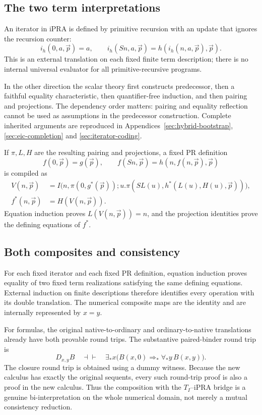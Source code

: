 \documentclass[11pt]{article}
\theoremstyle{definition}
\theoremstyle{remark}
\begin{document}
\subsection{The two term interpretations}

An iterator in iPRA is defined by primitive recursion with an update that
ignores the recursion counter:
\[
 i_h(0,a,\vec p)=a,\qquad
 i_h(Sn,a,\vec p)=h(i_h(n,a,\vec p),\vec p).
\]
This is an external translation on each fixed finite term description;
there is no internal universal evaluator for all primitive-recursive
programs.

In the other direction the scalar theory first constructs predecessor,
then a faithful equality characteristic, then quantifier-free induction,
and then pairing and projections. The dependency order matters: pairing
and equality reflection cannot be used as assumptions in the predecessor
construction. Complete inherited arguments are reproduced in
Appendices~\ref{sec:hybrid-bootstrap}, \ref{sec:eic-completion} and
\ref{sec:iterator-coding}.

If \(\pi,L,H\) are the resulting pairing and projections, a fixed PR
definition
\[
 f(0,\vec p)=g(\vec p),\qquad
 f(Sn,\vec p)=h(n,f(n,\vec p),\vec p)
\]
is compiled as
\begin{align*}
 V(n,\vec p)&=I\bigl(n,\pi(0,g^*(\vec p));
 u.\pi(SL(u),h^*(L(u),H(u),\vec p))\bigr),\\
 f^*(n,\vec p)&=H(V(n,\vec p)).
\end{align*}
Equation induction proves \(L(V(n,\vec p))=n\), and the projection
identities prove the defining equations of \(f^*\).

\subsection{Both composites and consistency}

For each fixed iterator and each fixed PR definition, equation induction
proves equality of two fixed term realizations satisfying the same
defining equations.
External induction on finite descriptions therefore identifies every
operation with its double translation. The numerical composite maps are
the identity and are internally represented by \(x=y\).

For formulas, the original native-to-ordinary and ordinary-to-native
translations already have both provable round trips. The substantive
paired-binder round trip is
\[
 D_{x,y}B\quad\dashv\vdash\quad
 \exists_*x\bigl(B(x,0)\Rightarrow_*\forall_*y\,B(x,y)\bigr).
\]
The closure round trip is obtained using a dummy witness. Because the new
calculus has exactly the original sequents, every such round-trip proof
is also a proof in the new calculus. Thus the composition with the
\(T_I\)--iPRA bridge is a genuine bi-interpretation on the whole
numerical domain, not merely a mutual consistency reduction.
\end{document}
